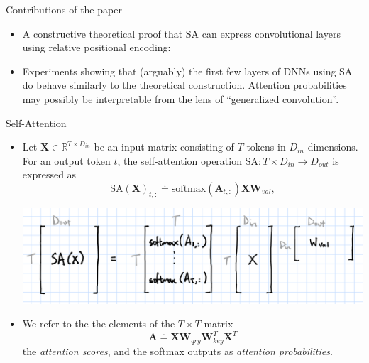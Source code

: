 \documentclass[9pt]{beamer}
\newcommand{\bb}{\mathbb}
\newcommand{\mb}{\bm}
\begin{document}
\begin{frame}{Contributions of the paper}
\begin{itemize}
\item A constructive theoretical proof that SA can express convolutional layers using relative positional encoding:
\end{itemize}

\begin{center}
\vspace{.15in}
\noindent{}
\vspace{.2in}
\end{center}

\begin{itemize}
\item Experiments showing that (arguably) the first few layers of DNNs using SA do behave similarly to the theoretical construction. Attention probabilities may possibly be interpretable from the lens of ``generalized convolution''.
\end{itemize}
\end{frame}


\begin{frame}{Self-Attention}
\begin{itemize}
\item Let $\bm X\in\bb R^{T\times D_{in}}$ be an input matrix consisting of $T$ tokens in $D_{in}$ dimensions. For an output token $t$, the self-attention operation $\mathrm{SA}:T\times D_{in}\rightarrow D_{out}$ is expressed as
\begin{equation}
  \mathrm{SA}(\mb X)_{t,:} \doteq \mathrm{softmax}(\mb A_{t,:})\mb X\mb W_{val},
\end{equation}
\begin{center}
    \includegraphics[width=.7\textwidth]{images/softmax.png}
\end{center}
\vspace{.1in}

\item We refer to the the elements of the $T\times T$ matrix
\begin{equation}
\mb A \doteq \mb X \mb W_{qry}\mb W_{key}^T\mb X^T
\end{equation}
the {\em attention scores}, and the softmax outputs as {\em attention probabilities}.
\end{itemize}
\end{frame}
\end{document}
